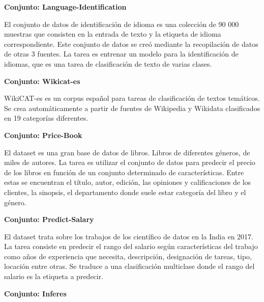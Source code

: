 \begin{annexes}
\begin{flushleft} 
    { \textbf{Conjunto: Language-Identification}}\label{description:languaje}
\end{flushleft}

El conjunto de datos de identificación de idioma es una colección de 90 000 muestras que consisten en la entrada de texto y la etiqueta de idioma correspondiente. 
Este conjunto de datos se creó mediante la recopilación de datos de otras 3 fuentes. La tarea es entrenar un modelo para la identificación de idiomas, que es una tarea 
de clasificación de texto de varias clases.

\begin{flushleft} 
    { \textbf{Conjunto: Wikicat-es}}\label{description:wikicat}
\end{flushleft}

WikiCAT-es es un corpus español para tareas de clasificación de textos temáticos. Se crea automáticamente a partir de fuentes de Wikipedia y Wikidata clasificados 
en 19 categorías diferentes. 

\begin{flushleft} 
    { \textbf{Conjunto: Price-Book}}\label{description:price}
\end{flushleft}

El dataset es una gran base de datos de libros. Libros de diferentes géneros, de miles de autores. La tarea es utilizar el conjunto de datos para predecir el precio de 
los libros en función de un conjunto determinado de características. Entre estas se encuentran el título, autor, edición, las opiniones y calificaciones de los 
clientes, la sinopsis, el departamento donde suele estar categoría del libro y el género. 


\begin{flushleft} 
    { \textbf{Conjunto: Predict-Salary}}\label{description:predict}
\end{flushleft}

El dataset trata sobre los trabajos de los científico de datos en la India en 2017. La tarea consiste en predecir el rango del salario según características del 
trabajo como años de experiencia que necesita, descripción, designación de tareas, tipo, locación entre otras. Se traduce a una clasificación multiclase donde el rango 
del salario es la etiqueta a predecir.

\begin{flushleft} 
    { \textbf{Conjunto: Inferes}}\label{description:inferes}
\end{flushleft}


\end{annexes}
